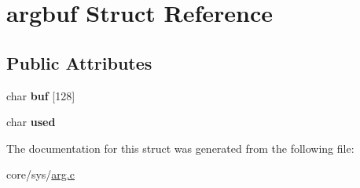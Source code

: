 \hypertarget{structargbuf}{\section{argbuf Struct Reference}
\label{structargbuf}
}
\subsection*{Public Attributes}
\begin{DoxyCompactItemize}
\item 
\hypertarget{structargbuf_a829f5183616437735b68aec3260e68cb}{char {\bfseries buf} \mbox{[}128\mbox{]}}\label{structargbuf_a829f5183616437735b68aec3260e68cb}

\item 
\hypertarget{structargbuf_a0e7dd31129a15a2ab3d64ff48a735d28}{char {\bfseries used}}\label{structargbuf_a0e7dd31129a15a2ab3d64ff48a735d28}

\end{DoxyCompactItemize}


The documentation for this struct was generated from the following file\-:\begin{DoxyCompactItemize}
\item 
core/sys/\hyperlink{arg_8c}{arg.\-c}\end{DoxyCompactItemize}
